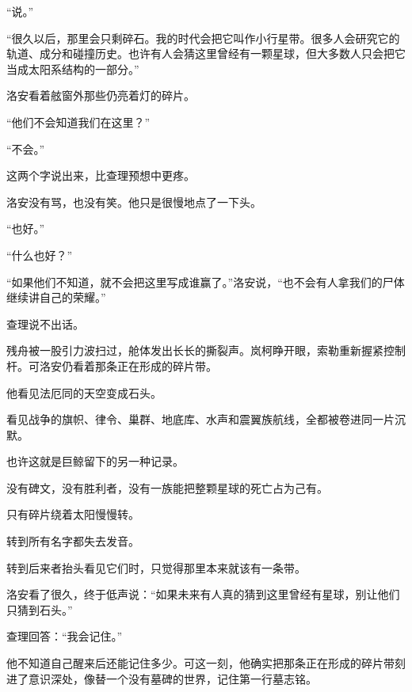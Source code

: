 “说。”

“很久以后，那里会只剩碎石。我的时代会把它叫作小行星带。很多人会研究它的轨道、成分和碰撞历史。也许有人会猜这里曾经有一颗星球，但大多数人只会把它当成太阳系结构的一部分。”

洛安看着舷窗外那些仍亮着灯的碎片。

“他们不会知道我们在这里？”

“不会。”

这两个字说出来，比查理预想中更疼。

洛安没有骂，也没有笑。他只是很慢地点了一下头。

“也好。”

“什么也好？”

“如果他们不知道，就不会把这里写成谁赢了。”洛安说，“也不会有人拿我们的尸体继续讲自己的荣耀。”

查理说不出话。

残舟被一股引力波扫过，舱体发出长长的撕裂声。岚柯睁开眼，索勒重新握紧控制杆。可洛安仍看着那条正在形成的碎片带。

他看见法厄同的天空变成石头。

看见战争的旗帜、律令、巢群、地底库、水声和震翼族航线，全都被卷进同一片沉默。

也许这就是巨鲸留下的另一种记录。

没有碑文，没有胜利者，没有一族能把整颗星球的死亡占为己有。

只有碎片绕着太阳慢慢转。

转到所有名字都失去发音。

转到后来者抬头看见它们时，只觉得那里本来就该有一条带。

洛安看了很久，终于低声说：“如果未来有人真的猜到这里曾经有星球，别让他们只猜到石头。”

查理回答：“我会记住。”

他不知道自己醒来后还能记住多少。可这一刻，他确实把那条正在形成的碎片带刻进了意识深处，像替一个没有墓碑的世界，记住第一行墓志铭。
